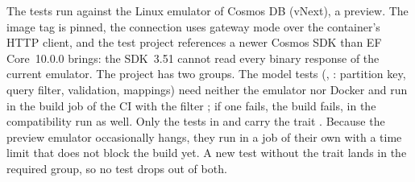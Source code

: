\begin{note}
  The tests run against the Linux emulator of Cosmos DB (vNext), a preview. The image tag is
  pinned, the connection uses gateway mode over the container's HTTP client, and the test
  project references a newer Cosmos SDK than EF Core~10.0.0 brings: the SDK~3.51 cannot read
  every binary response of the current emulator. The project has two groups. The model tests
  (, : partition
  key, query filter, validation, mappings) need neither the
  emulator nor Docker and run in the build job of the CI with the filter
  ; if one fails, the build fails, in the compatibility
  run as well. Only the tests in  and
   carry the trait
  . Because the preview emulator occasionally hangs, they
  run in a job of their own with a time limit that does not block the build yet. A new test
  without the trait lands in the required group, so no test drops out of both.
\end{note}
